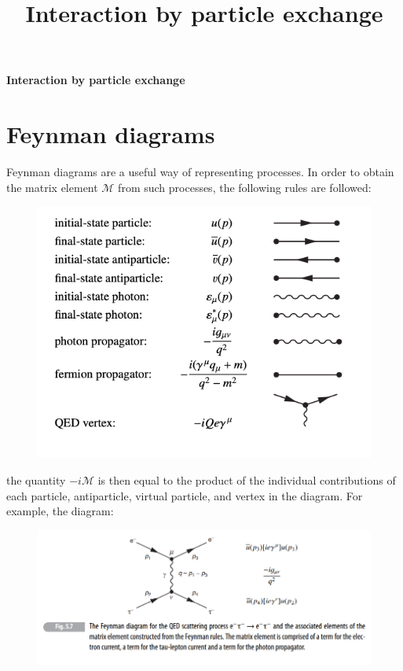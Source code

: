 \documentclass[10pt]{article}
\theoremstyle{definition}
\begin{document}
\setcounter{section}{1}
\title{Interaction by particle exchange}

\pagestyle{fancy}
\fancyhf{}
\setlength{\headheight}{12.0pt}

\begin{center}
{\LARGE \bf Interaction by particle exchange}\\
\end{center}

\section*{Feynman diagrams}

Feynman diagrams are a useful way of representing processes. In order to obtain the matrix element $\mathcal{M}$ from such processes, the following rules are followed:

\begin{figure}[H]
    \centering
    \includegraphics[scale=0.5]{feynman diagram matrix components.png}
\end{figure}

the quantity $-i\mathcal{M}$ is then equal to the product of the individual contributions of each particle, antiparticle, virtual particle, and vertex in the diagram. For example, the diagram:

\begin{figure}[H]
    \centering
    \includegraphics[scale=0.65]{fig 5.7.png}
\end{figure}
\end{document}
